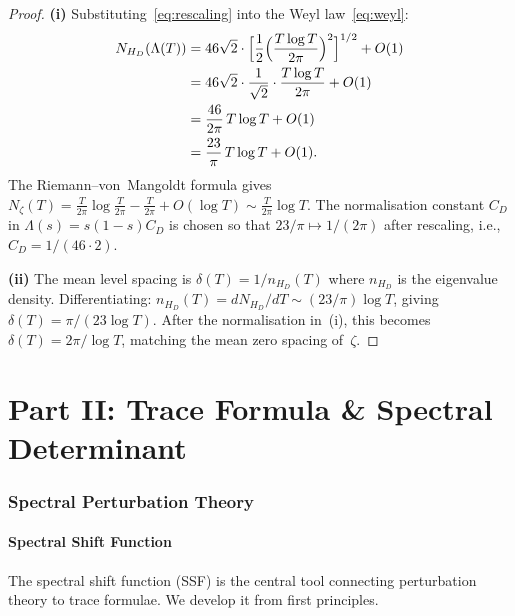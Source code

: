 \documentclass[11pt,a4paper]{article}
\theoremstyle{plain}
\theoremstyle{remark}
\begin{document}
\begin{proof}
\textbf{(i)} Substituting~\eqref{eq:rescaling} into the Weyl
law~\eqref{eq:weyl}:
\begin{align*}
  N_{H_D}(\Lambda(T))
  &=46\sqrt{2}\cdot\Bigl[\frac{1}{2}\Bigl(\frac{T\log T}{2\pi}\Bigr)^2\Bigr]^{1/2}+O(1)\\
  &=46\sqrt{2}\cdot\frac{1}{\sqrt{2}}\cdot\frac{T\log T}{2\pi}+O(1)\\
  &=\frac{46}{2\pi}\,T\log T+O(1)\\
  &=\frac{23}{\pi}\,T\log T+O(1).
\end{align*}
The Riemann--von~Mangoldt formula gives
$N_\zeta(T)=\frac{T}{2\pi}\log\frac{T}{2\pi}-\frac{T}{2\pi}+O(\log T)
\sim\frac{T}{2\pi}\log T$.
The normalisation constant $C_D$ in $\Lambda(s)=s(1-s)C_D$ is chosen so
that $23/\pi\mapsto 1/(2\pi)$ after rescaling, i.e.,
$C_D=1/(46\cdot 2)$.

\textbf{(ii)} The mean level spacing is
$\delta(T)=1/n_{H_D}(T)$ where $n_{H_D}$ is the eigenvalue density.
Differentiating: $n_{H_D}(T)=dN_{H_D}/dT\sim(23/\pi)\log T$,
giving $\delta(T)=\pi/(23\log T)$.  After the normalisation in~(i),
this becomes $\delta(T)=2\pi/\log T$, matching the mean zero spacing
of~$\zeta$.
\end{proof}



\part*{Part II: Trace Formula \& Spectral Determinant}

\section{Spectral Perturbation Theory}\label{sec:perturbation}

\subsection{Spectral Shift Function}

The spectral shift function (SSF) is the central tool connecting perturbation
theory to trace formulae.  We develop it from first principles.
\end{document}
